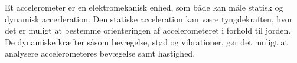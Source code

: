 Et accelerometer er en elektromekanisk enhed, som både kan måle statisk og dynamisk accerleration. Den statiske acceleration kan være tyngdekraften, hvor det er muligt at bestemme orienteringen af accelerometeret i forhold til jorden. De dynamiske kræfter såsom bevægelse, stød og vibrationer, gør det muligt at analysere accelerometeres bevægelse samt hastighed.